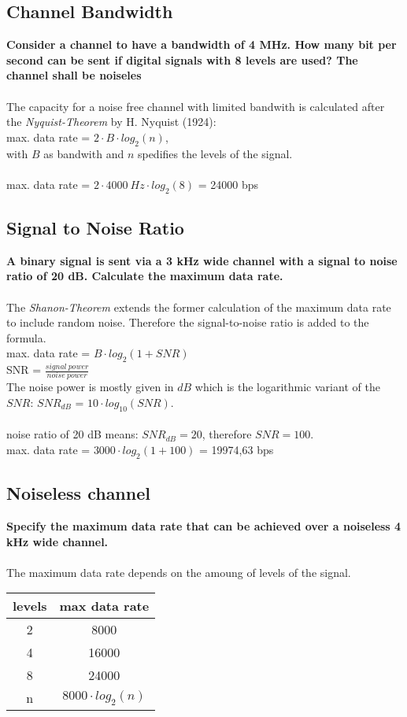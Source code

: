 \documentclass[a4paper,12pt]{article}
\begin{document}
	
\subsection{Channel Bandwidth}
\textbf{Consider a channel to have a bandwidth of 4 MHz. How many bit per second can be sent if digital signals with 8 levels are used? The channel shall be noiseles}\\
\\
The capacity for a noise free channel with limited bandwith is calculated after the \textit{Nyquist-Theorem} by H. Nyquist (1924):\\
max. data rate = $2 \cdot B \cdot log_{2}(n)$,\\
with $B$ as bandwith and $n$ spedifies the levels of the signal.
\\
\\
max. data rate = $2 \cdot 4000~Hz \cdot log_{2}(8)$ = 24000 bps
	
\subsection{Signal to Noise Ratio}
\textbf{A binary signal is sent via a 3 kHz wide channel with a signal to noise ratio of 20 dB. Calculate the maximum data rate.}\\
\\
The \textit{Shanon-Theorem} extends the former calculation of the maximum data rate to include random noise. Therefore the signal-to-noise ratio is added to the formula.\\
max. data rate = $B \cdot log_{2}(1 + SNR)$\\
SNR = $\frac{signal~power}{noise~power}$\\
The noise power is mostly given in $dB$ which is the logarithmic variant of the $SNR$: $SNR_{dB}$ = $10 \cdot log_{10}(SNR)$.\\
\\
noise ratio of 20 dB means: $SNR_{dB} = 20$, therefore $SNR = 100$.\\
max. data rate = $3000 \cdot log_{2}(1 +100)$ = 19974,63 bps\\

\subsection{Noiseless channel}
\textbf{Specify the maximum data rate that can be achieved over a noiseless 4 kHz wide channel.}\\
\\
The maximum data rate depends on the amoung of levels of the signal. \\
\begin{tabular}{c|c} \hline
	\textbf{levels} & \textbf{max data rate} \\ \hline
	2 & 8000 \\
	4 & 16000 \\
	8 & 24000 \\ \hline
	n & $8000 \cdot log_{2}(n)$ 
\end{tabular}
\end{document}
